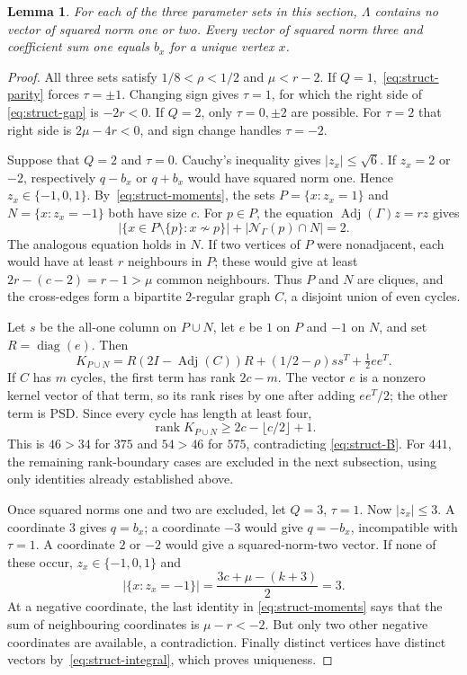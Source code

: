 \documentclass[11pt]{article}
\newtheorem{lemma}[theorem]{Lemma}
\theoremstyle{remark}
\numberwithin{equation}{section}
\begin{document}
\begin{lemma}\label{lem:struct-shell}
For each of the three parameter sets in this section, $\Lambda$
contains no vector of squared norm one or two.  Every vector of
squared norm three and coefficient sum one equals $b_x$ for a unique
vertex $x$.
\end{lemma}
\begin{proof}
All three sets satisfy $1/8<\rho<1/2$ and $\mu<r-2$.
If $Q=1$,~\eqref{eq:struct-parity} forces $\tau=\pm1$.
Changing sign gives $\tau=1$, for which the right side of
\eqref{eq:struct-gap} is $-2r<0$.
If $Q=2$, only $\tau=0,\pm2$ are possible.  For $\tau=2$ that
right side is $2\mu-4r<0$, and sign change handles $\tau=-2$.

Suppose that $Q=2$ and $\tau=0$.  Cauchy's inequality gives
$|z_x|\le\sqrt6$.  If $z_x=2$ or $-2$, respectively $q-b_x$
or $q+b_x$ would have squared norm one.  Hence
$z_x\in\{-1,0,1\}$.  By~\eqref{eq:struct-moments}, the sets
$P=\{x:z_x=1\}$ and $N=\{x:z_x=-1\}$ both have size $c$.
For $p\in P$, the equation $\operatorname{Adj}(\Gamma)z=rz$
gives
\begin{equation}\label{eq:struct-defect}
 |\{x\in P\setminus\{p\}:x\not\sim p\}|
 +|\mathcal N_\Gamma(p)\cap N|=2.
\end{equation}
The analogous equation holds in $N$.  If two vertices of $P$ were
nonadjacent, each would have at least $r$ neighbours in $P$; these
would give at least $2r-(c-2)=r-1>\mu$ common neighbours.
Thus $P$ and $N$ are cliques, and the cross-edges form a bipartite
$2$-regular graph $C$, a disjoint union of even cycles.

Let $s$ be the all-one column on $P\cup N$, let $e$ be $1$ on $P$
and $-1$ on $N$, and set $R=\operatorname{diag}(e)$.  Then
\begin{equation}\label{eq:struct-root-rank}
 K_{P\cup N}=R(2I-\operatorname{Adj}(C))R
 +(1/2-\rho)ss^T+\tfrac12ee^T.
\end{equation}
If $C$ has $m$ cycles, the first term has rank $2c-m$.
The vector $e$ is a nonzero kernel vector of that term, so its
rank rises by one after adding $ee^T/2$; the other term is PSD.
Since every cycle has length at least four,
\[
 \operatorname{rank}K_{P\cup N}
 \ge2c-\lfloor c/2\rfloor+1.
\]
This is $46>34$ for $375$ and $54>46$ for $575$, contradicting
\eqref{eq:struct-B}.  For $441$, the remaining rank-boundary
cases are excluded in the next subsection, using only identities
already established above.

Once squared norms one and two are excluded, let $Q=3$, $\tau=1$.
Now $|z_x|\le3$.  A coordinate $3$ gives $q=b_x$; a coordinate
$-3$ would give $q=-b_x$, incompatible with $\tau=1$.
A coordinate $2$ or $-2$ would give a squared-norm-two vector.
If none of these occur, $z_x\in\{-1,0,1\}$ and
\[
 |\{x:z_x=-1\}|=
 \frac{3c+\mu-(k+3)}2=3.
\]
At a negative coordinate, the last identity in
\eqref{eq:struct-moments} says that the sum of neighbouring
coordinates is $\mu-r<-2$.  But only two other negative
coordinates are available, a contradiction.  Finally distinct
vertices have distinct vectors by~\eqref{eq:struct-integral},
which proves uniqueness.
\end{proof}
\end{document}
